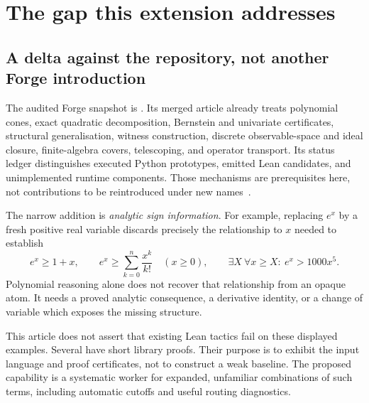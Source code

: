 \section{The gap this extension addresses}
\label{sec:scope}

\subsection{A delta against the repository, not another Forge introduction}

The audited Forge snapshot is
.
Its merged article already treats polynomial cones, exact quadratic decomposition,
Bernstein and univariate certificates, structural generalisation, witness
construction, discrete observable-space and ideal closure, finite-algebra
covers, telescoping, and operator transport. Its status ledger distinguishes
executed Python prototypes, emitted Lean candidates, and unimplemented runtime
components. Those mechanisms are prerequisites here, not contributions to be
reintroduced under new names~\cite{forge-readme,forge-status,forge-nonlinear,forge-closure}.

The narrow addition is \emph{analytic sign information}. For example, replacing
$e^x$ by a fresh positive real variable discards precisely the relationship to
$x$ needed to establish
\[
 e^x\ge 1+x,\qquad
 e^x\ge \sum_{k=0}^{n}\frac{x^k}{k!}\quad(x\ge0),\qquad
 \exists X\ \forall x\ge X:\ e^x>1000x^5.
\]
Polynomial reasoning alone does not recover that relationship from an opaque
atom. It needs a proved analytic consequence, a derivative identity, or a
change of variable which exposes the missing structure.

This article does not assert that existing Lean tactics fail on these displayed
examples. Several have short library proofs. Their purpose is to exhibit the
input language and proof certificates, not to construct a weak baseline. The
proposed capability is a systematic worker for expanded, unfamiliar combinations
of such terms, including automatic cutoffs and useful routing diagnostics.


